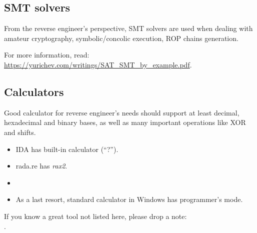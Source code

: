 \subsection{SMT solvers}

From the reverse engineer's perspective, SMT solvers are used when dealing with
amateur cryptography,
symbolic/concolic execution,
ROP chains generation.

For more information, read: \url{https://yurichev.com/writings/SAT_SMT_by_example.pdf}.

\subsection{Calculators}

Good calculator for reverse engineer's needs should support at least decimal, hexadecimal and binary bases,
as well as many important operations like XOR and shifts.

\begin{itemize}

\item IDA has built-in calculator (``?'').

\item rada.re has \emph{rax2}.

\item \ProgCalcURL

\item As a last resort, standard calculator in Windows has programmer's mode.

\end{itemize}


If you know a great tool not listed here, please drop a note:\\
\TT{\EMAILS}.

